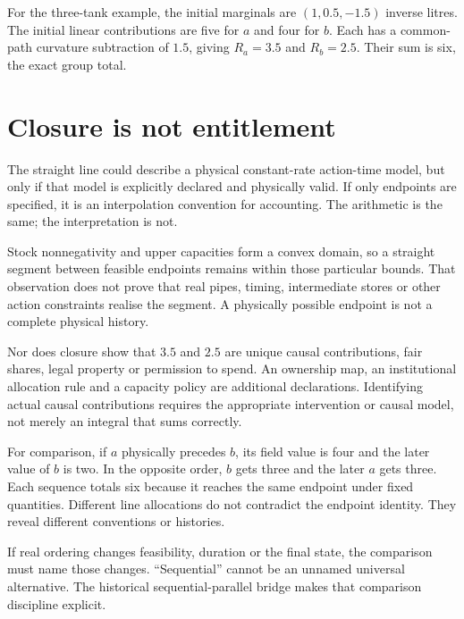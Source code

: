 For the three-tank example, the initial marginals are $(1,0.5,-1.5)$ inverse litres. The initial linear contributions are five for $a$ and four for $b$. Each has a common-path curvature subtraction of $1.5$, giving $R_a=3.5$ and $R_b=2.5$. Their sum is six, the exact group total.

\section{Closure is not entitlement}
The straight line could describe a physical constant-rate action-time model, but only if that model is explicitly declared and physically valid. If only endpoints are specified, it is an interpolation convention for accounting. The arithmetic is the same; the interpretation is not.

Stock nonnegativity and upper capacities form a convex domain, so a straight segment between feasible endpoints remains within those particular bounds. That observation does not prove that real pipes, timing, intermediate stores or other action constraints realise the segment. A physically possible endpoint is not a complete physical history.

Nor does closure show that $3.5$ and $2.5$ are unique causal contributions, fair shares, legal property or permission to spend. An ownership map, an institutional allocation rule and a capacity policy are additional declarations. Identifying actual causal contributions requires the appropriate intervention or causal model, not merely an integral that sums correctly.

For comparison, if $a$ physically precedes $b$, its field value is four and the later value of $b$ is two. In the opposite order, $b$ gets three and the later $a$ gets three. Each sequence totals six because it reaches the same endpoint under fixed quantities. Different line allocations do not contradict the endpoint identity. They reveal different conventions or histories.

If real ordering changes feasibility, duration or the final state, the comparison must name those changes. ``Sequential'' cannot be an unnamed universal alternative. The historical sequential-parallel bridge makes that comparison discipline explicit.\cite{bridge}


